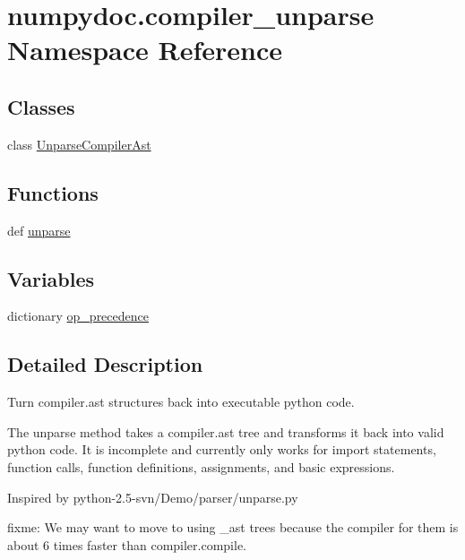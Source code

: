 \hypertarget{namespacenumpydoc_1_1compiler__unparse}{}\section{numpydoc.\+compiler\+\_\+unparse Namespace Reference}
\label{namespacenumpydoc_1_1compiler__unparse}
\subsection*{Classes}
\begin{DoxyCompactItemize}
\item 
class \hyperlink{classnumpydoc_1_1compiler__unparse_1_1UnparseCompilerAst}{Unparse\+Compiler\+Ast}
\end{DoxyCompactItemize}
\subsection*{Functions}
\begin{DoxyCompactItemize}
\item 
def \hyperlink{namespacenumpydoc_1_1compiler__unparse_a01a260f130da09c556c6b450469aa302}{unparse}
\end{DoxyCompactItemize}
\subsection*{Variables}
\begin{DoxyCompactItemize}
\item 
dictionary \hyperlink{namespacenumpydoc_1_1compiler__unparse_a5d24e3b59f35071c9eb84d10365945c1}{op\+\_\+precedence}
\end{DoxyCompactItemize}


\subsection{Detailed Description}
\begin{DoxyVerb}Turn compiler.ast structures back into executable python code.

    The unparse method takes a compiler.ast tree and transforms it back into
    valid python code.  It is incomplete and currently only works for
    import statements, function calls, function definitions, assignments, and
    basic expressions.

    Inspired by python-2.5-svn/Demo/parser/unparse.py

    fixme: We may want to move to using _ast trees because the compiler for
           them is about 6 times faster than compiler.compile.
\end{DoxyVerb}
 

